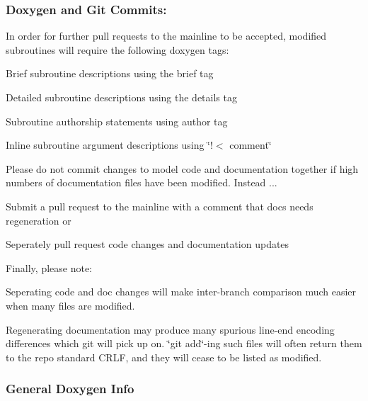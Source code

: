 \subsubsection*{\label{_doxygit}%
 Doxygen and Git Commits\+: }

In order for further pull requests to the mainline to be accepted, modified subroutines will require the following doxygen tags\+:
\begin{DoxyItemize}
\item Brief subroutine descriptions using the brief tag
\item Detailed subroutine descriptions using the details tag
\item Subroutine authorship statements using author tag
\item Inline subroutine argument descriptions using \char`\"{}!$<$ comment\char`\"{}
\end{DoxyItemize}

Please do not commit changes to model code and documentation together if high numbers of documentation files have been modified. Instead ...
\begin{DoxyItemize}
\item Submit a pull request to the mainline with a comment that docs needs regeneration or
\item Seperately pull request code changes and documentation updates
\end{DoxyItemize}

Finally, please note\+:
\begin{DoxyItemize}
\item Seperating code and doc changes will make inter-\/branch comparison much easier when many files are modified.
\item Regenerating documentation may produce many spurious line-\/end encoding differences which git will pick up on. \char`\"{}git add\char`\"{}-\/ing such files will often return them to the repo standard C\+R\+LF, and they will cease to be listed as modified.
\end{DoxyItemize}

\subsubsection*{\label{_doxyinfo}%
 General Doxygen Info }

